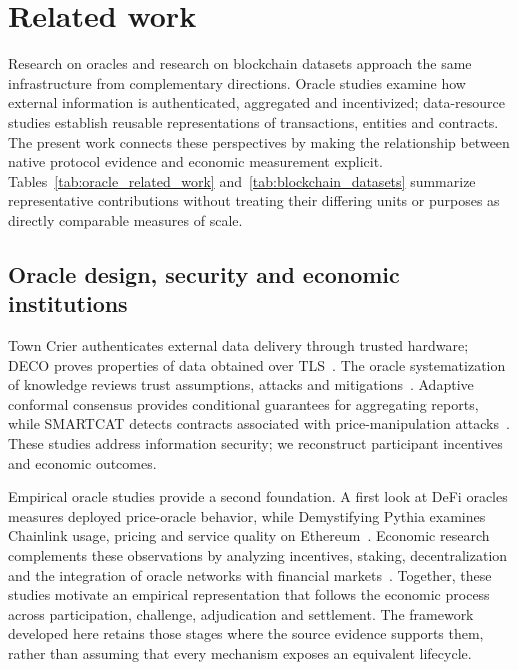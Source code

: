 

\section{Related work}

Research on oracles and research on blockchain datasets approach the same infrastructure from complementary directions. Oracle studies examine how external information is authenticated, aggregated and incentivized; data-resource studies establish reusable representations of transactions, entities and contracts. The present work connects these perspectives by making the relationship between native protocol evidence and economic measurement explicit. Tables~\ref{tab:oracle_related_work} and~\ref{tab:blockchain_datasets} summarize representative contributions without treating their differing units or purposes as directly comparable measures of scale.

\subsection{Oracle design, security and economic institutions}

Town Crier authenticates external data delivery through trusted hardware; DECO proves properties of data obtained over TLS~\cite{zhang2016towncrier,zhang2020deco}. The oracle systematization of knowledge reviews trust assumptions, attacks and mitigations~\cite{eskandari2021sok}. Adaptive conformal consensus provides conditional guarantees for aggregating reports, while SMARTCAT detects contracts associated with price-manipulation attacks~\cite{park2023acon,zhang2025smartcat}. These studies address information security; we reconstruct participant incentives and economic outcomes.

Empirical oracle studies provide a second foundation. A first look at DeFi oracles measures deployed price-oracle behavior, while Demystifying Pythia examines Chainlink usage, pricing and service quality on Ethereum~\cite{liu2021firstlook,kaleem2021pythia}. Economic research complements these observations by analyzing incentives, staking, decentralization and the integration of oracle networks with financial markets~\cite{cong2025oracleprimer,cong2026integration}. Together, these studies motivate an empirical representation that follows the economic process across participation, challenge, adjudication and settlement. The framework developed here retains those stages where the source evidence supports them, rather than assuming that every mechanism exposes an equivalent lifecycle.

